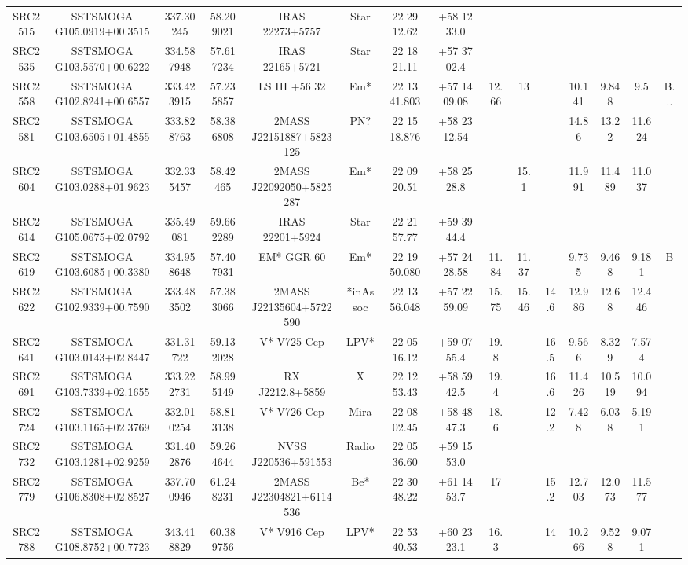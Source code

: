 \begin{table}
\begin{tabular}{ccccccccccccccc}
SRC2515 & SSTSMOGA G105.0919+00.3515 & 337.30245 & 58.209021 & IRAS 22273+5757 & Star & 22 29 12.62 & +58 12 33.0 &  &  &  &  &  &  &  \\
SRC2535 & SSTSMOGA G103.5570+00.6222 & 334.587948 & 57.617234 & IRAS 22165+5721 & Star & 22 18 21.11 & +57 37 02.4 &  &  &  &  &  &  &  \\
SRC2558 & SSTSMOGA G102.8241+00.6557 & 333.423915 & 57.235857 & LS III +56   32 & Em* & 22 13 41.803 & +57 14 09.08 & 12.66 & 13 &  & 10.141 & 9.848 & 9.5 & B... \\
SRC2581 & SSTSMOGA G103.6505+01.4855 & 333.828763 & 58.386808 & 2MASS J22151887+5823125 & PN? & 22 15 18.876 & +58 23 12.54 &  &  &  & 14.86 & 13.22 & 11.624 &  \\
SRC2604 & SSTSMOGA G103.0288+01.9623 & 332.335457 & 58.42465 & 2MASS J22092050+5825287 & Em* & 22 09 20.51 & +58 25 28.8 &  & 15.1 &  & 11.991 & 11.489 & 11.037 &  \\
SRC2614 & SSTSMOGA G105.0675+02.0792 & 335.49081 & 59.662289 & IRAS 22201+5924 & Star & 22 21 57.77 & +59 39 44.4 &  &  &  &  &  &  &  \\
SRC2619 & SSTSMOGA G103.6085+00.3380 & 334.958648 & 57.407931 & EM* GGR   60 & Em* & 22 19 50.080 & +57 24 28.58 & 11.84 & 11.37 &  & 9.735 & 9.468 & 9.181 & B \\
SRC2622 & SSTSMOGA G102.9339+00.7590 & 333.483502 & 57.383066 & 2MASS J22135604+5722590 & *inAssoc & 22 13 56.048 & +57 22 59.09 & 15.75 & 15.46 & 14.6 & 12.986 & 12.68 & 12.446 &  \\
SRC2641 & SSTSMOGA G103.0143+02.8447 & 331.31722 & 59.132028 & V* V725 Cep & LPV* & 22 05 16.12 & +59 07 55.4 & 19.8 &  & 16.5 & 9.566 & 8.329 & 7.574 &  \\
SRC2691 & SSTSMOGA G103.7339+02.1655 & 333.222731 & 58.995149 & RX J2212.8+5859 & X & 22 12 53.43 & +58 59 42.5 & 19.4 &  & 16.6 & 11.426 & 10.519 & 10.094 &  \\
SRC2724 & SSTSMOGA G103.1165+02.3769 & 332.010254 & 58.813138 & V* V726 Cep & Mira & 22 08 02.45 & +58 48 47.3 & 18.6 &  & 12.2 & 7.428 & 6.038 & 5.191 &  \\
SRC2732 & SSTSMOGA G103.1281+02.9259 & 331.402876 & 59.264644 & NVSS J220536+591553 & Radio & 22 05 36.60 & +59 15 53.0 &  &  &  &  &  &  &  \\
SRC2779 & SSTSMOGA G106.8308+02.8527 & 337.700946 & 61.248231 & 2MASS J22304821+6114536 & Be* & 22 30 48.22 & +61 14 53.7 & 17 &  & 15.2 & 12.703 & 12.073 & 11.577 &  \\
SRC2788 & SSTSMOGA G108.8752+00.7723 & 343.418829 & 60.389756 & V* V916 Cep & LPV* & 22 53 40.53 & +60 23 23.1 & 16.3 &  & 14 & 10.266 & 9.528 & 9.071 &  \\

\end{tabular}
\end{table}
